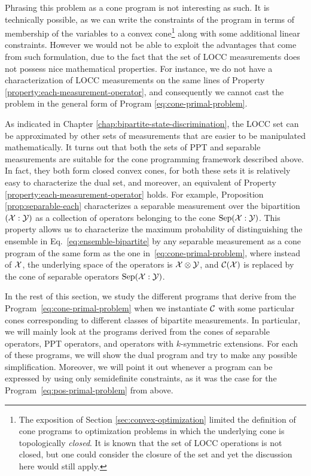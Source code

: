 Phrasing this problem as a cone program is not interesting as such. It is
technically possible, as we can write the constraints of the program in terms 
of membership of the variables to a convex cone\footnote{The exposition of 
Section \ref{sec:convex-optimization} limited the definition of cone programs
to optimization problems in which the underlying cone is topologically \emph{closed}. 
It is known that the set of LOCC operations is not closed, but one could consider 
the closure of the set \cite{Chitambar14} and yet the discussion here would still apply.} 
along with some additional linear constraints.
However we would not be able to exploit the advantages that come from such formulation, 
due to the fact that the set of LOCC measurements does not possess nice mathematical properties.
For instance, we do not have a characterization of LOCC measurements
on the same lines of Property \ref{property:each-measurement-operator}, and consequently 
we cannot cast the problem in the general form of Program \eqref{eq:cone-primal-problem}. 

As indicated in Chapter \ref{chap:bipartite-state-discrimination}, the LOCC set
can be approximated by other sets of measurements that are easier to be manipulated 
mathematically. It turns out that both the sets of PPT and separable measurements are
suitable for the cone programming framework described above. In fact, they both
form closed convex cones, for both these sets it is relatively easy to characterize the dual set, 
and moreover, an equivalent of Property \ref{property:each-measurement-operator} holds.
For example, Proposition \ref{prop:separable-each} characterizes a separable 
measurement over the bipartition $(\mathcal{X}:\mathcal{Y})$ as a collection of operators 
belonging to the cone $\mathrm{Sep}(\mathcal{X}:\mathcal{Y})$.
This property allows us to characterize the maximum probability of 
distinguishing the ensemble in Eq.~\eqref{eq:ensemble-bipartite} by any 
separable measurement as a cone program of the same form as the one 
in~\eqref{eq:cone-primal-problem}, where instead of $\mathcal{X}$, the underlying space 
of the operators is $\mathcal{X}\otimes\mathcal{Y}$, and $\mathcal{C}(\mathcal{X})$ is replaced by the cone of 
separable operators $\mathrm{Sep}(\mathcal{X}:\mathcal{Y})$.

In the rest of this section, we study the different programs that derive 
from the Program~\eqref{eq:cone-primal-problem} when we instantiate $\mathcal{C}$ with
some particular cones corresponding to different classes of bipartite 
measurements. In particular, we will mainly look at the programs derived from the cones
of separable operators, PPT operators, and operators with $k$-symmetric extensions.
For each of these programs, we will show the dual program and try to make any possible
simplification. Moreover, we will point it out whenever a program can be 
expressed by using only semidefinite constraints, as it was the case for the 
Program~\eqref{eq:pos-primal-problem} from above.

